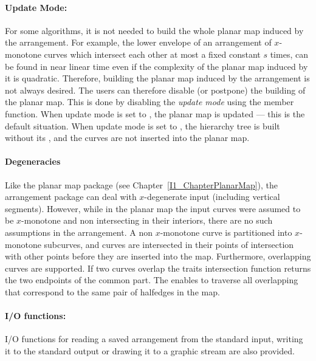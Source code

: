 \paragraph{Update Mode:} For some algorithms, it is not needed to build
the whole planar map induced by the arrangement. For example, the lower
envelope of an arrangement of $x$-monotone curves which intersect
each other at most a fixed constant $s$ times,
can be found in near linear time \cite{sa-dsstg-95, h-a-97}
even if
the complexity of the planar map induced by it is quadratic.
Therefore, building the planar map induced by the arrangement is not
always desired. The users can therefore disable (or postpone) the building
of the planar map. This is done by disabling the {\it update mode}
using the  member function. When update mode is
set to , the planar map is updated --- this is the
default situation. 
When update mode is set to , the hierarchy tree is built without
its , and the curves are not inserted into the planar map.

\paragraph{Degeneracies} Like the planar map package (see
Chapter~\ref{I1_ChapterPlanarMap}), the arrangement package can deal with
$x$-degenerate input (including vertical segments). However, while in the
planar map the input curves were assumed to be $x$-monotone and non
intersecting in their interiors, there are no such assumptions in the
arrangement. A non $x$-monotone curve is partitioned into $x$-monotone
subcurves, and curves are intersected in their points of intersection
with other points
before they are inserted into the map. Furthermore, overlapping curves are
supported. If two curves overlap the traits intersection function returns
the two endpoints of the common part. The 
enables to traverse all overlapping  that correspond to
the same pair of halfedges in the map.

\paragraph{I/O functions:}
I/O functions for reading a saved arrangement from the standard input, 
writing it to the standard output or drawing it to a graphic stream are also provided.





